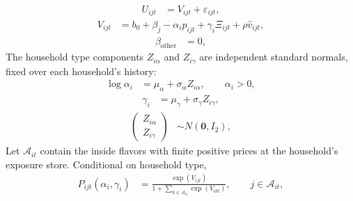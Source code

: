 \documentclass[11pt]{article}
\begin{document}
\begin{equation}
\begin{aligned}
U_{ijt}&=V_{ijt}+\varepsilon_{ijt},
\end{aligned}
\end{equation}
\begin{equation}
\begin{aligned}
V_{ijt}&=b_0+\beta_j-\alpha_i p_{ijt}+\gamma_i\Xi_{ijt}+\rho\widehat v_{ijt},
\end{aligned}
\end{equation}
\begin{equation}
\begin{aligned}
\beta_{\mathrm{other}}&=0,
\end{aligned}
\end{equation}
The household type components $Z_{i\alpha}$ and $Z_{i\gamma}$ are independent
standard normals, fixed over each household's history:
\begin{equation}
\begin{aligned}
\log\alpha_i&=\mu_\alpha+\sigma_\alpha Z_{i\alpha},\qquad \alpha_i>0,
\end{aligned}
\end{equation}
\begin{equation}
\begin{aligned}
\gamma_i&=\mu_\gamma+\sigma_\gamma Z_{i\gamma},
\end{aligned}
\end{equation}
\begin{equation}
\begin{aligned}
\begin{pmatrix}Z_{i\alpha}\\Z_{i\gamma}\end{pmatrix}&\sim N(\boldsymbol0,I_2),
\end{aligned}
\end{equation}
Let $\mathcal A_{it}$ contain the inside flavors with finite positive prices
at the household's exposure store. Conditional on household type,
\begin{equation}
\begin{aligned}
P_{ijt}(\alpha_i,\gamma_i)&=\frac{\exp(V_{ijt})}{1+\sum_{k\in\mathcal A_{it}}\exp(V_{ikt})},\qquad j\in\mathcal A_{it},
\end{aligned}
\end{equation}
\end{document}
